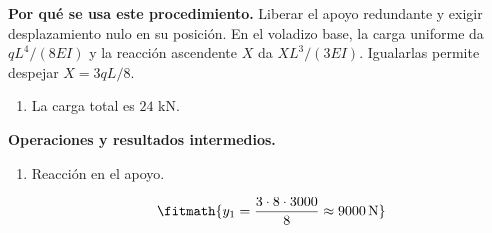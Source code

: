 \noindent\textbf{Por qué se usa este procedimiento.} Liberar el apoyo redundante y exigir desplazamiento nulo en su posición. En el voladizo base, la carga uniforme da $qL^4/(8EI)$ y la reacción ascendente $X$ da $XL^3/(3EI)$. Igualarlas permite despejar $X=3qL/8$.

\begin{enumerate}

\item La carga total es $24$ kN.

\end{enumerate}

\noindent\textbf{Operaciones y resultados intermedios.}

\begin{enumerate}

\item Reacción en el apoyo.

\[\fitmath{y_{1}=\frac{3\cdot 8\cdot 3000}{8}\approx 9000\,\mathrm{N}}\]

\end{enumerate}
